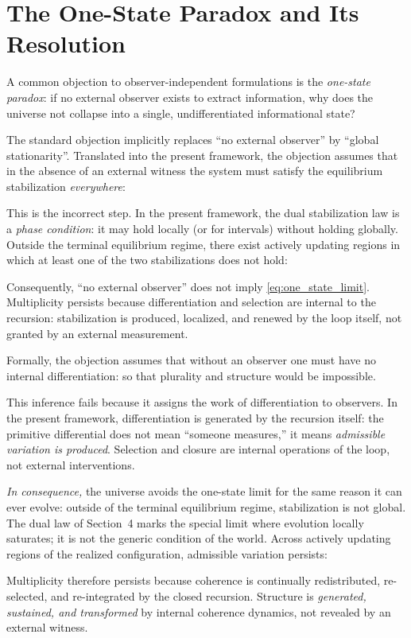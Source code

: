 \documentclass[11pt]{article}
\begin{document}
\section{The One-State Paradox and Its Resolution}

A common objection to observer-independent formulations is the \emph{one-state paradox}:
if no external observer exists to extract information, why does the universe not collapse into a single,
undifferentiated informational state?

The standard objection implicitly replaces ``no external observer'' by ``global stationarity''.
Translated into the present framework, the objection assumes that in the absence of an external witness
the system must satisfy the equilibrium stabilization \emph{everywhere}:

This is the incorrect step. In the present framework, the dual stabilization law is a \emph{phase condition}:
it may hold locally (or for intervals) without holding globally. Outside the terminal equilibrium regime,
there exist actively updating regions in which at least one of the two stabilizations does not hold:

Consequently, ``no external observer'' does not imply \eqref{eq:one_state_limit}. Multiplicity persists
because differentiation and selection are internal to the recursion: stabilization is produced, localized,
and renewed by the loop itself, not granted by an external measurement.


Formally, the objection assumes that without an observer one must have no internal differentiation: so that plurality and structure would be impossible.

This inference fails because it assigns the work of differentiation to observers. In the present
framework, differentiation is generated by the recursion itself: the primitive differential does not
mean ``someone measures,'' it means \emph{admissible variation is produced}. Selection and closure are
internal operations of the loop, not external interventions.

\textit{In consequence,} the universe avoids the one-state limit for the same reason it can ever evolve:
outside of the terminal equilibrium regime, stabilization is not global. The dual law of Section~4
marks the special limit where evolution locally saturates; it is not the generic condition of the
world. Across actively updating regions of the realized configuration, admissible variation persists:

Multiplicity therefore persists because coherence is continually redistributed, re-selected, and
re-integrated by the closed recursion. Structure is \emph{generated, sustained, and transformed} by
internal coherence dynamics, not revealed by an external witness.
\end{document}
